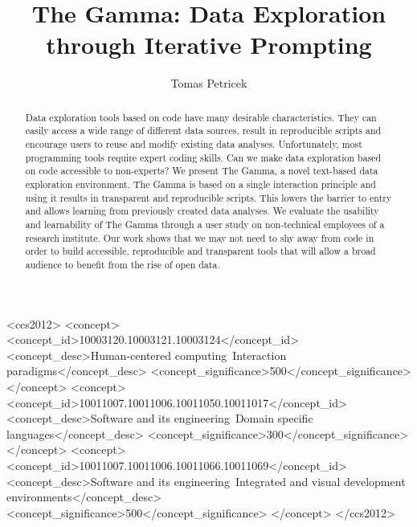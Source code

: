 \documentclass[manuscript,review,anonymous]{acmart}
\begin{document}
\title{The Gamma: Data Exploration through Iterative Prompting}

\author{Tomas Petricek}

\begin{abstract}
  Data exploration tools based on code have many desirable characteristics. They can easily access
  a wide range of different data sources, result in reproducible scripts and encourage users to
  reuse and modify existing data analyses. Unfortunately, most programming tools require expert
  coding skills. Can we make data exploration based on code accessible to non-experts?
  We present The Gamma, a novel text-based data exploration environment.
  The Gamma is based on a single interaction principle and using it results in transparent and
  reproducible scripts. This lowers the barrier to entry and allows learning from previously
  created data analyses. We evaluate the usability and learnability of The Gamma through a user
  study on non-technical employees of a research institute.
  Our work shows that we may not need to shy away from code in order to build accessible,
  reproducible and transparent tools that will allow a broad audience to benefit from the
  rise of open data.
\end{abstract}

\begin{CCSXML}
<ccs2012>
   <concept>
       <concept_id>10003120.10003121.10003124</concept_id>
       <concept_desc>Human-centered computing~Interaction paradigms</concept_desc>
       <concept_significance>500</concept_significance>
       </concept>
   <concept>
       <concept_id>10011007.10011006.10011050.10011017</concept_id>
       <concept_desc>Software and its engineering~Domain specific languages</concept_desc>
       <concept_significance>300</concept_significance>
       </concept>
   <concept>
       <concept_id>10011007.10011006.10011066.10011069</concept_id>
       <concept_desc>Software and its engineering~Integrated and visual development environments</concept_desc>
       <concept_significance>500</concept_significance>
       </concept>
 </ccs2012>
\end{CCSXML}

\end{document}
